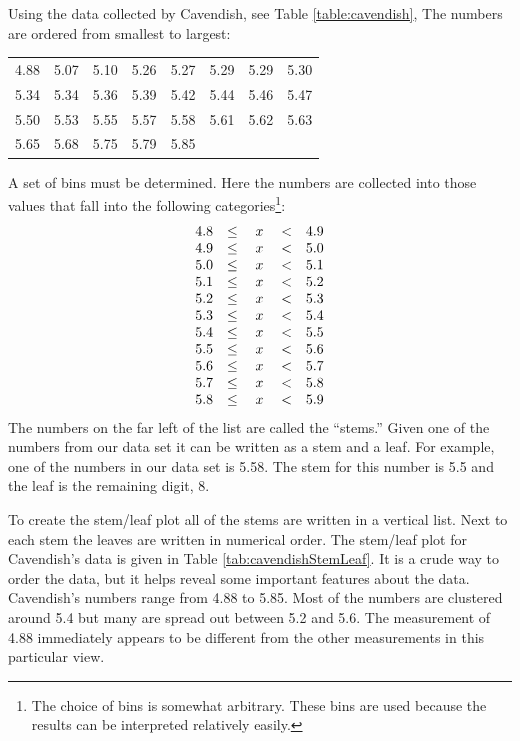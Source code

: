 \documentclass[12pt]{article}
\begin{document}
Using the data collected by Cavendish, see Table
\ref{table:cavendish}, The numbers are ordered from smallest
to largest: \\
\begin{center}
\begin{tabular}{rrrrrrrr}
4.88 & 5.07 & 5.10 & 5.26 & 5.27 & 5.29 & 5.29 & 5.30 \\
5.34 & 5.34 & 5.36 & 5.39 & 5.42 & 5.44 & 5.46 & 5.47 \\
5.50 & 5.53 & 5.55 & 5.57 & 5.58 & 5.61 & 5.62 & 5.63 \\
5.65 & 5.68 & 5.75 & 5.79 & 5.85
\end{tabular}
\end{center}

A set of bins must be determined. Here the numbers are collected into
those values that fall into the following categories\footnote{The
  choice of bins is somewhat arbitrary. These bins are used because
  the results can be interpreted relatively easily.}:
\begin{eqnarray*}
  \begin{array}{r@{\hspace{1em}\leq\hspace{1em}x\hspace{1em}<\hspace{1em}}l}
    4.8 & 4.9 \\
    4.9 & 5.0 \\
    5.0 & 5.1 \\
    5.1 & 5.2 \\
    5.2 & 5.3 \\
    5.3 & 5.4 \\
    5.4 & 5.5 \\
    5.5 & 5.6 \\
    5.6 & 5.7 \\
    5.7 & 5.8 \\
    5.8 & 5.9
  \end{array}
\end{eqnarray*}
The numbers on the far left of the list are called the ``stems.''
Given one of the numbers from our data set it can be written as a stem
and a leaf. For example, one of the numbers in our data set is 5.58.
The stem for this number is 5.5 and the leaf is the remaining digit,
8.

To create the stem/leaf plot all of the stems are written in a
vertical list. Next to each stem the leaves are written in numerical
order. The stem/leaf plot for Cavendish's data is given in Table
\ref{tab:cavendishStemLeaf}. It is a crude way to order the data, but
it helps reveal some important features about the data.  Cavendish's
numbers range from 4.88 to 5.85.  Most of the numbers are clustered
around 5.4 but many are spread out between 5.2 and 5.6. The
measurement of 4.88 immediately appears to be different from the other
measurements in this particular view.
\end{document}
